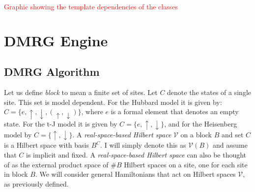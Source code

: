 \documentclass[paper=letter]{scrartcl}
\newcommand{\todo}[1]{\textcolor{red}{#1}}
\begin{document}
\todo{Graphic showing the template dependencies of the classes}

\section{DMRG Engine}
\subsection{DMRG Algorithm}
Let us define {\it block} to mean a finite set of sites. 
Let $C$ denote the states of a single site. This set is model dependent. For the Hubbard model it is given by:
$C=\{e,\uparrow,\downarrow,(\uparrow,\downarrow)\}$, where $e$ is a formal element that denotes an empty state.
For the t-J model it is given by  $C=\{e,\uparrow,\downarrow\}$, and for the Heisenberg model by  $C=\{\uparrow,\downarrow\}$. 
A {\it real-space-based Hilbert space} $\mathcal{V}$ on a block $B$ and  set $C$ is a 
 Hilbert space with basis $B^{C}$.  I will simply denote this as $\mathcal{V}(B)$ and assume that $C$ 
 is implicit and fixed.
A {\it real-space-based Hilbert space} can also be thought of as the external product space of $\#B$ Hilbert spaces on a site, one for each
 site in block $B$.
We will consider general Hamiltonians   that
 act on Hilbert spaces $\mathcal{V}$, as previously defined.
\end{document}
